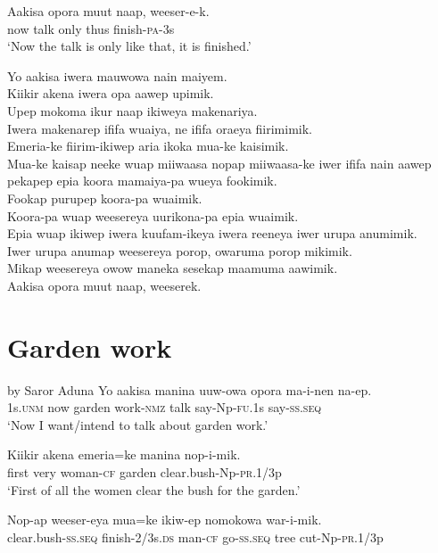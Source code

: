 \ea
\gll  Aakisa  opora  muut  naap,  weeser-e-k. \\
now  talk  only  thus  finish-\textsc{pa}-3s \\
\glt ‘Now the talk is only like that, it is finished.’ \\
\z


Yo aakisa iwera mauwowa nain maiyem. \\
Kiikir akena iwera opa aawep upimik. \\
Upep mokoma ikur naap ikiweya makenariya. \\
Iwera makenarep ififa wuaiya, ne ififa oraeya fiirimimik. \\
Emeria-ke fiirim-ikiwep aria ikoka mua-ke kaisimik. \\
Mua-ke kaisap neeke wuap miiwaasa nopap miiwaasa-ke iwer ififa nain aawep pekapep epia koora mamaiya-pa wueya fookimik. \\
Fookap purupep koora-pa wuaimik. \\
Koora-pa wuap weesereya uurikona-pa epia wuaimik. \\
Epia wuap ikiwep iwera kuufam-ikeya iwera reeneya iwer urupa anumimik. \\
Iwer urupa anumap weesereya porop, owaruma porop mikimik. \\
Mikap weesereya owow maneka sesekap maamuma aawimik. \\
\textrm{Aakisa opora muut naap, weeserek.  }
\setcounter{equation}{0}
\section{Garden work}
 by Saror Aduna
\ea
\gll  Yo  aakisa  manina  uuw-owa  opora  ma-i-nen  na-ep. \\
1s.\textsc{unm}  now  garden  work-\textsc{nmz}  talk  say-Np-\textsc{fu}.1s  say-\textsc{ss.seq} \\
\glt ‘Now I want/intend to talk about garden work.’ \\
\z


\ea
\gll  Kiikir  akena  emeria=ke  manina  nop-i-mik. \\
first  very  woman-\textsc{cf}  garden  clear.bush-Np-\textsc{pr}.1/3p \\
\glt ‘First of all the women clear the bush for the garden.’ \\
\z


\ea
\gll  Nop-ap  weeser-eya  mua=ke  ikiw-ep  nomokowa         war-i-mik. \\
clear.bush-\textsc{ss.seq}  finish-2/3s.\textsc{ds}  man-\textsc{cf}  go-\textsc{ss.seq}  tree  cut-Np-\textsc{pr}.1/3p \\


